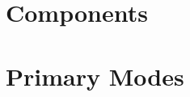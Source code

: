 \documentclass[12pt]{report}
\newcommand{\ers}[1]{\extrarowsep=#1mm}
\newcommand{\thrule}{\toprule \hline}
\newcommand{\bhrule}{\hline \bottomrule}
\newcommand{\mrule}{\hline}
\newcommand{\thbi}[1]{\textbf{\textit{\large #1}}}
\newcommand{\fontTGA}[2]{%
\ifthenelse{\equal{#1}{h}}{{\huge \qag #2}}{}%
\ifthenelse{\equal{#1}{l}}{{\large \qag #2}}{}%
\ifthenelse{\equal{#1}{n}}{{\qag #2}}{}%
\ifthenelse{\equal{#1}{s}}{{\small \qag #2}}{}%
\ifthenelse{\equal{#1}{f}}{{\footnotesize \qag #2}}{}%
\ifthenelse{\equal{#1}{ss}}{{\scriptsize \qag #2}}{}%
\ifthenelse{\equal{#1}{t}}{{\tiny \qag #2}}{}}
\newcommand{\symTGA}[3]{%
\begin{tikz}[overlay]
  \node[fill=#1,draw=black,inner sep=1mm,anchor=text,rectangle,rounded corners=0.5mm]
    at (0.06,0.03) {\color{#2} \fontTGA{ss}{#3}};
\end{tikz}%
\phantom{\fontTGA{ss}{#3}}}%
\newcommand{\symTGAL}[3]{%
\vspace{-5ex}\begin{flushright}
\begin{tikz}[overlay]
  \node[fill=#1,draw=black,inner sep=1.5mm,anchor=text,rectangle,rounded corners=1.0mm,thick]
    at (0.06,0.03) {\color{#2} \textbf{\fontTGA{n}{#3}}};
\end{tikz}%
\phantom{\fontTGA{n}{#3}}\end{flushright}\vskip 1.5ex}%
\newcommand{\control}[2]{%
\ifthenelse{\equal{#1}{sym}}{\symTGA{black}{white}{#2}}{\fontTGA{#1}{#2}}}
\newcommand{\mode}[2]{%
\ifthenelse{\equal{#1}{sym}}{\symTGA{black}{white}{#2}}{%
\ifthenelse{\equal{#1}{syml}}{\symTGAL{black}{white}{#2}}{\fontTGA{#1}{#2}}}}
\newcommand{\cTS}[1]{\control{#1}{TOUCH SENSOR}}
\newcommand{\mSC}[1]{\mode{#1}{SET CLOCK}}
\newcommand{\mTS}[1]{\mode{#1}{TOUCH SETTINGS}}
\begin{document}
%





\part{Components} \label{Components}




\part{Primary Modes} \label{Primary Modes}



\end{document}
